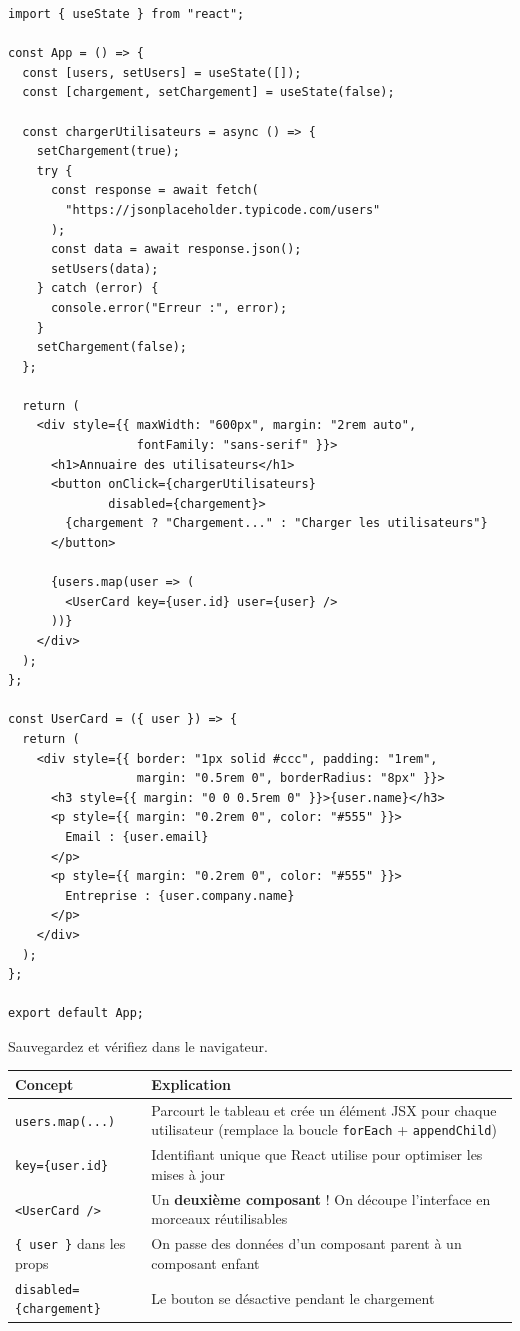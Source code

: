 \documentclass[11pt,a4paper]{article}
\begin{document}
\begin{lstlisting}
import { useState } from "react";

const App = () => {
  const [users, setUsers] = useState([]);
  const [chargement, setChargement] = useState(false);

  const chargerUtilisateurs = async () => {
    setChargement(true);
    try {
      const response = await fetch(
        "https://jsonplaceholder.typicode.com/users"
      );
      const data = await response.json();
      setUsers(data);
    } catch (error) {
      console.error("Erreur :", error);
    }
    setChargement(false);
  };

  return (
    <div style={{ maxWidth: "600px", margin: "2rem auto",
                  fontFamily: "sans-serif" }}>
      <h1>Annuaire des utilisateurs</h1>
      <button onClick={chargerUtilisateurs}
              disabled={chargement}>
        {chargement ? "Chargement..." : "Charger les utilisateurs"}
      </button>

      {users.map(user => (
        <UserCard key={user.id} user={user} />
      ))}
    </div>
  );
};

const UserCard = ({ user }) => {
  return (
    <div style={{ border: "1px solid #ccc", padding: "1rem",
                  margin: "0.5rem 0", borderRadius: "8px" }}>
      <h3 style={{ margin: "0 0 0.5rem 0" }}>{user.name}</h3>
      <p style={{ margin: "0.2rem 0", color: "#555" }}>
        Email : {user.email}
      </p>
      <p style={{ margin: "0.2rem 0", color: "#555" }}>
        Entreprise : {user.company.name}
      </p>
    </div>
  );
};

export default App;
\end{lstlisting}

Sauvegardez et vérifiez dans le navigateur.

\begin{infobox}
\begin{tabular}{lp{8cm}}
\toprule
\textbf{Concept} & \textbf{Explication} \\
\midrule
\texttt{users.map(...)} & Parcourt le tableau et crée un élément JSX pour chaque utilisateur (remplace la boucle \texttt{forEach} + \texttt{appendChild}) \\
\texttt{key=\{user.id\}} & Identifiant unique que React utilise pour optimiser les mises à jour \\
\texttt{<UserCard />} & Un \textbf{deuxième composant} ! On découpe l'interface en morceaux réutilisables \\
\texttt{\{ user \}} dans les props & On passe des données d'un composant parent à un composant enfant \\
\texttt{disabled=\{chargement\}} & Le bouton se désactive pendant le chargement \\
\bottomrule
\end{tabular}
\end{infobox}
\end{document}
